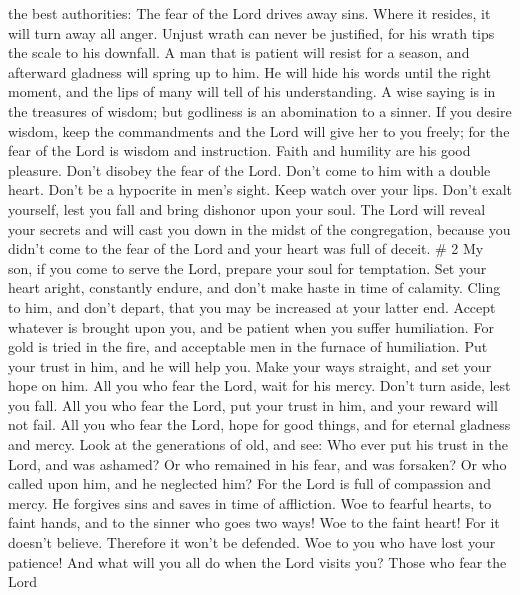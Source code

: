 the best authorities: The fear of the Lord drives away sins. Where it
resides, it will turn away all anger.  Unjust wrath can
never be justified, for his wrath tips the scale to his downfall.
 A man that is patient will resist for a season, and
afterward gladness will spring up to him.  He will hide his
words until the right moment, and the lips of many will tell of his
understanding.  A wise saying is in the treasures of
wisdom; but godliness is an abomination to a sinner.  If
you desire wisdom, keep the commandments and the Lord will give her to
you freely;  for the fear of the Lord is wisdom and
instruction. Faith and humility are his good pleasure. 
Don't disobey the fear of the Lord. Don't come to him with a double
heart.  Don't be a hypocrite in men's sight. Keep watch
over your lips.  Don't exalt yourself, lest you fall and
bring dishonor upon your soul. The Lord will reveal your secrets and
will cast you down in the midst of the congregation, because you didn't
come to the fear of the Lord and your heart was full of deceit. \# 2
 My son, if you come to serve the Lord, prepare your soul
for temptation.  Set your heart aright, constantly endure,
and don't make haste in time of calamity.  Cling to him, and
don't depart, that you may be increased at your latter end. 
Accept whatever is brought upon you, and be patient when you suffer
humiliation.  For gold is tried in the fire, and acceptable
men in the furnace of humiliation.  Put your trust in him,
and he will help you. Make your ways straight, and set your hope on him.
 All you who fear the Lord, wait for his mercy. Don't turn
aside, lest you fall.  All you who fear the Lord, put your
trust in him, and your reward will not fail.  All you who
fear the Lord, hope for good things, and for eternal gladness and mercy.
 Look at the generations of old, and see: Who ever put his
trust in the Lord, and was ashamed? Or who remained in his fear, and was
forsaken? Or who called upon him, and he neglected him? 
For the Lord is full of compassion and mercy. He forgives sins and saves
in time of affliction.  Woe to fearful hearts, to faint
hands, and to the sinner who goes two ways!  Woe to the
faint heart! For it doesn't believe. Therefore it won't be defended.
 Woe to you who have lost your patience! And what will you
all do when the Lord visits you?  Those who fear the Lord
